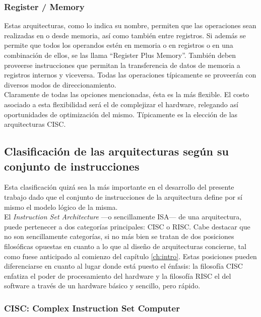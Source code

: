 \subsubsection{Register / Memory}
\label{subsubsec:theory-modern-data_managment-register_memory}

Estas arquitecturas, como lo indica su nombre, permiten que las operaciones 
sean realizadas en o desde memoria, así como también entre registros. Si además 
se permite que todos los operandos estén en memoria o en registros o en una 
combinación de ellos, se las llama ``Register Plus Memory''. También deben 
proveerse instrucciones que permitan la transferencia de datos de memoria a 
registros internos y viceversa. Todas las operaciones típicamente se proveerán 
con diversos modos de direccionamiento.\\
Claramente de todas las opciones mencionadas, ésta es la más flexible. El costo 
asociado a esta flexibilidad será el de complejizar el hardware, relegando así 
oportunidades de optimización del mismo. Típicamente es la elección de las 
arquitecturas CISC.

\subsection{Clasificación de las arquitecturas según su conjunto de 
instrucciones}
\label{subsec:theory-modern-isa_class}

Esta clasificación quizá sea la más importante en el desarrollo del presente 
trabajo dado que el conjunto de instrucciones de la arquitectura define por sí 
mismo el modelo lógico de la misma.\\
El \emph{Instruction Set Architecture} ---o sencillamente ISA--- de una 
arquitectura, puede pertenecer a dos categorías principales: CISC o RISC. Cabe 
destacar que no son sencillamente categorías, si no más bien se tratan de dos 
posiciones filosóficas opuestas en cuanto a lo que al diseño de arquitecturas 
concierne, tal como fuese anticipado al comienzo del capítulo \ref{ch:intro}. 
Estas posiciones pueden diferenciarse en cuanto al lugar donde está puesto el 
énfasis: la filosofía CISC enfatiza el poder de procesamiento del hardware y la 
filosofía RISC el del software a través de un hardware básico y sencillo, pero 
rápido. 

\subsubsection{CISC: Complex Instruction Set Computer}
\label{subsubsec:theory-modern-isa_class-cisc}

